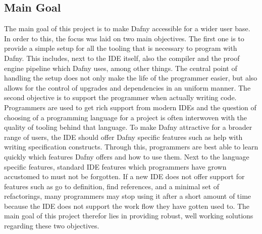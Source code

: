 \subsection{Main Goal}\label{mainGoal}
The main goal of this project is to make Dafny accessible for a wider user base. In order to this, the focus was laid on two main objectives. \newline
The first one is to provide a simple setup for all the tooling that is necessary to program with Dafny. This includes, next to the IDE itself, also the compiler and the proof engine pipeline which Dafny uses, among other things. The central point of handling the setup does not only make the life of the programmer easier, but also allows for the control of upgrades and dependencies in an uniform manner. \newline
The second objective is to support the programmer when actually writing code. Programmers are used to get rich support from modern IDEs and the question of choosing of a programming language for a project is often interwoven with the quality of tooling behind that language. To make Dafny attractive for a broader range of users, the IDE should offer Dafny specific features such as help with writing specification constructs. Through this, programmers are best able to learn quickly which features Dafny offers and how to use them. Next to the language specific features, standard IDE features which programmers have grown accustomed to must not be forgotten. If a new IDE does not offer support for features such as go to definition, find references, and a minimal set of refactorings, many programmers may stop using it after a short amount of time because the IDE does not support the work flow they have gotten used to. \newline
The main goal of this project therefor lies in providing robust, well working solutions regarding these two objectives. \newline